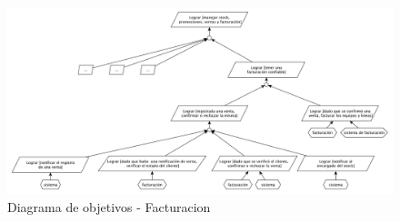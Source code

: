 \begin{figure}[h!]
  \centering
  \includegraphics[width=1\textwidth]{./imagenes/facturacion.pdf}
  \caption{Diagrama de objetivos - Facturacion}
\end{figure}


